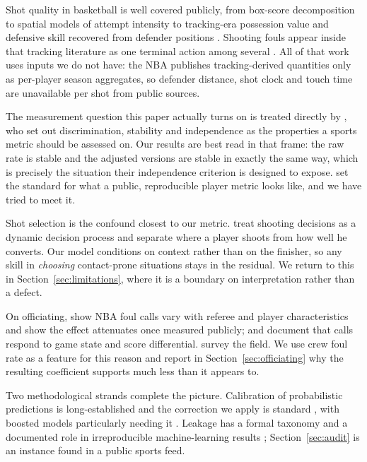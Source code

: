\documentclass[11pt,letterpaper]{article}
\begin{document}
Shot quality in basketball is well covered publicly, from box-score
decomposition \citep{kubatko2007starting} to spatial models of attempt intensity
\citep{miller2014factorized} to tracking-era possession value
\citep{cervone2016multiresolution} and defensive skill recovered from defender
positions \citep{franks2015characterizing}. Shooting fouls appear inside that
tracking literature as one terminal action among several
\citep{sicilia2019deephoops}. All of that work uses inputs we do not have: the
NBA publishes tracking-derived quantities only as per-player season aggregates,
so defender distance, shot clock and touch time are unavailable per shot from
public sources.

The measurement question this paper actually turns on is treated directly by
\citet{franks2016meta}, who set out discrimination, stability and independence as
the properties a sports metric should be assessed on. Our results are best read
in that frame: the raw rate is stable and the adjusted versions are stable in
exactly the same way, which is precisely the situation their independence
criterion is designed to expose. \citet{baumer2015openwar} set the standard for
what a public, reproducible player metric looks like, and we have tried to meet
it.

Shot selection is the confound closest to our metric. \citet{sandholtz2020markov}
treat shooting decisions as a dynamic decision process and
\citet{sandholtz2020measuring} separate where a player shoots from how well he
converts. Our model conditions on context rather than on the finisher, so any
skill in \emph{choosing} contact-prone situations stays in the residual. We
return to this in Section~\ref{sec:limitations}, where it is a boundary on
interpretation rather than a defect.

On officiating, \citet{price2010racial} show NBA foul calls vary with referee and
player characteristics and \citet{pope2018awareness} show the effect attenuates
once measured publicly; \citet{anderson2009officiating} and
\citet{price2012subperfect} document that calls respond to game state and score
differential. \citet{dohmen2016referee} survey the field. We use crew foul rate
as a feature for this reason and report in Section~\ref{sec:officiating} why the
resulting coefficient supports much less than it appears to.

Two methodological strands complete the picture. Calibration of probabilistic
predictions is long-established \citep{brier1950verification} and the correction
we apply is standard \citep{zadrozny2002transforming}, with boosted models
particularly needing it \citep{niculescu2005predicting, guo2017calibration}.
Leakage has a formal taxonomy \citep{kaufman2012leakage} and a documented role in
irreproducible machine-learning results \citep{kapoor2023leakage};
Section~\ref{sec:audit} is an instance found in a public sports feed.
\end{document}
